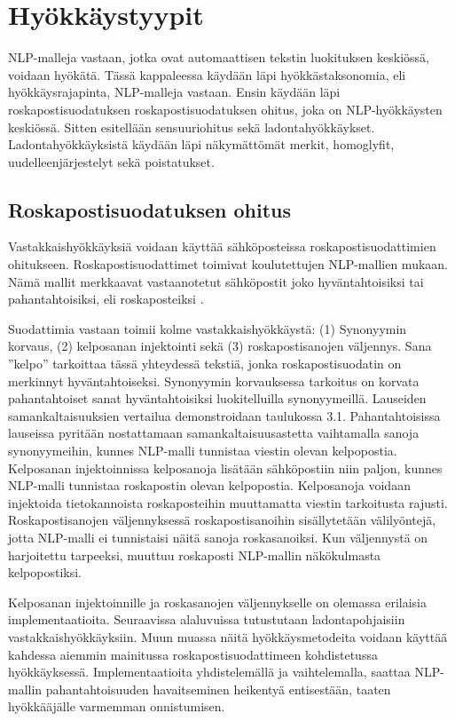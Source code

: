 \chapter{Hyökkäystyypit\label{results}}

NLP-malleja vastaan, jotka ovat automaattisen tekstin luokituksen keskiössä, voidaan hyökätä. Tässä kappaleessa käydään läpi hyökkästaksonomia, eli hyökkäysrajapinta, NLP-malleja vastaan. Ensin käydään läpi roskapostisuodatuksen roskapostisuodatuksen ohitus, joka on NLP-hyökkäysten keskiössä. Sitten esitellään sensuuriohitus sekä ladontahyökkäykset. Ladontahyökkäyksistä käydään läpi näkymättömät merkit, homoglyfit, uudelleenjärjestelyt sekä poistatukset.

\section{Roskapostisuodatuksen ohitus}
Vastakkaishyökkäyksiä voidaan käyttää sähköposteissa roskapostisuodattimien ohitukseen. Roskapostisuodattimet toimivat koulutettujen NLP-mallien mukaan. Nämä mallit merkkaavat vastaanotetut sähköpostit joko hyväntahtoisiksi tai pahantahtoisiksi, eli roskaposteiksi \citep{spamfilter}.

Suodattimia vastaan toimii kolme vastakkaishyökkäystä: (1) Synonyymin korvaus, (2) kelposanan injektointi sekä (3) roskapostisanojen väljennys. Sana ''kelpo'' tarkoittaa tässä yhteydessä tekstiä, jonka roskapostisuodatin on merkinnyt hyväntahtoiseksi. Synonyymin korvauksessa tarkoitus on korvata pahantahtoiset sanat hyväntahtoisiksi luokitelluilla synonyymeillä. Lauseiden samankaltaisuuksien vertailua demonstroidaan taulukossa 3.1. Pahantahtoisissa lauseissa pyritään nostattamaan samankaltaisuusastetta vaihtamalla sanoja synonyymeihin, kunnes NLP-malli tunnistaa viestin olevan kelpopostia. Kelposanan injektoinnissa kelposanoja lisätään sähköpostiin niin paljon, kunnes NLP-malli tunnistaa roskapostin olevan kelpopostia. Kelposanoja voidaan injektoida tietokannoista roskaposteihin muuttamatta viestin tarkoitusta rajusti. Roskapostisanojen väljennyksessä roskapostisanoihin sisällytetään välilyöntejä, jotta NLP-malli ei tunnistaisi näitä sanoja roskasanoiksi. Kun väljennystä on harjoitettu tarpeeksi, muuttuu roskaposti NLP-mallin näkökulmasta kelpopostiksi. \citep{spamfilter}

Kelposanan injektoinnille ja roskasanojen väljennykselle on olemassa erilaisia implementaatioita. Seuraavissa alaluvuissa tutustutaan ladontapohjaisiin vastakkaishyökkäyksiin. Muun muassa näitä hyökkäysmetodeita voidaan käyttää kahdessa aiemmin mainitussa roskapostisuodattimeen kohdistetussa hyökkäyksessä. Implementaatioita yhdistelemällä ja vaihtelemalla, saattaa NLP-mallin pahantahtoisuuden havaitseminen heikentyä entisestään, taaten hyökkääjälle varmemman onnistumisen.

